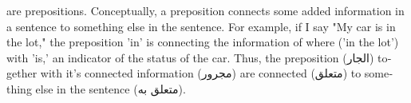\documentclass[../main.tex]{subfiles}
\begin{document}
\begin{english}
     are prepositions. Conceptually, a preposition connects some added information in a sentence to something else in the sentence. For example, if I say "My car is in the lot," the preposition 'in' is connecting the information of where ('in the lot') with 'is,' an indicator of the status of the car. Thus, the preposition (\textarabic{الجار}) together with it's connected information (\textarabic{مجرور}) are connected (\textarabic{متعلق}) to something else in the sentence (\textarabic{متعلق به}).
\end{english}


\end{document}
